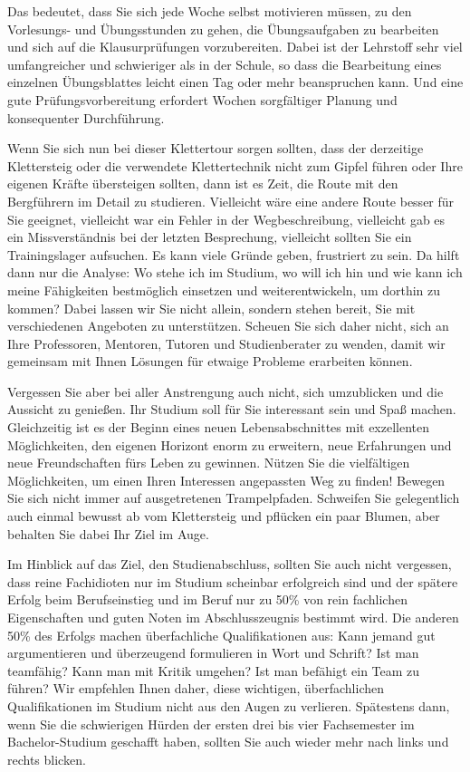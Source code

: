 {    Das bedeutet, dass Sie sich jede Woche selbst motivieren müssen, zu den Vorlesungs- und Übungsstunden zu gehen, die Übungsaufgaben zu bearbeiten und sich auf die Klausurprüfungen vorzubereiten. Dabei ist der Lehrstoff sehr viel umfangreicher und schwieriger als in der Schule, so dass die Bearbeitung eines einzelnen Übungsblattes leicht einen Tag oder mehr beanspruchen kann. Und eine gute Prüfungsvorbereitung erfordert Wochen sorgfältiger Planung und konsequenter Durchführung.

    Wenn Sie sich nun bei dieser Klettertour sorgen sollten, dass der derzeitige Klettersteig oder die verwendete Klettertechnik nicht zum Gipfel führen oder Ihre eigenen Kräfte übersteigen sollten, dann ist es Zeit, die Route mit den Bergführern im Detail zu studieren. Vielleicht wäre eine andere Route besser für Sie geeignet, vielleicht war ein Fehler in der Wegbeschreibung, vielleicht gab es ein Missverständnis bei der letzten Besprechung, vielleicht sollten Sie ein Trainingslager aufsuchen. Es kann viele Gründe geben, frustriert zu sein. Da hilft dann nur die Analyse: Wo stehe ich im Studium, wo will ich hin und wie kann ich meine Fähigkeiten bestmöglich einsetzen und weiterentwickeln, um dorthin zu kommen? Dabei lassen wir Sie nicht allein, sondern stehen bereit, Sie mit verschiedenen Angeboten zu unterstützen. Scheuen Sie sich daher nicht, sich an Ihre Professoren, Mentoren, Tutoren und Studienberater zu wenden, damit wir gemeinsam mit Ihnen Lösungen für etwaige Probleme erarbeiten können.


    Vergessen Sie aber bei aller Anstrengung auch nicht, sich umzublicken und die Aussicht zu genießen. Ihr Studium soll für Sie interessant sein und Spaß machen. Gleichzeitig ist es der Beginn eines neuen Lebensabschnittes mit exzellenten Möglichkeiten, den eigenen Horizont enorm zu erweitern, neue Erfahrungen und neue Freundschaften fürs Leben zu gewinnen. Nützen Sie die vielfältigen Möglichkeiten, um einen Ihren Interessen angepassten Weg zu finden! Bewegen Sie sich nicht immer auf ausgetretenen Trampelpfaden. Schweifen Sie gelegentlich auch einmal bewusst ab vom Klettersteig und pflücken ein paar Blumen, aber behalten Sie dabei Ihr Ziel im Auge.

    Im Hinblick auf das Ziel, den Studienabschluss, sollten Sie auch nicht vergessen, dass reine Fachidioten nur im Studium scheinbar erfolgreich sind und der spätere Erfolg beim Berufseinstieg und im Beruf nur zu 50\% von rein fachlichen Eigenschaften und guten Noten im Abschlusszeugnis bestimmt wird. Die anderen 50\% des Erfolgs machen überfachliche Qualifikationen aus: Kann jemand gut argumentieren und überzeugend formulieren in Wort und Schrift? Ist man teamfähig? Kann man mit Kritik umgehen? Ist man befähigt ein Team zu führen? Wir empfehlen Ihnen daher, diese wichtigen, überfachlichen Qualifikationen im Studium nicht aus den Augen zu verlieren. Spätestens dann, wenn Sie die schwierigen Hürden der ersten drei bis vier Fachsemester im Bachelor-Studium geschafft haben, sollten Sie auch wieder mehr nach links und rechts blicken.

}
